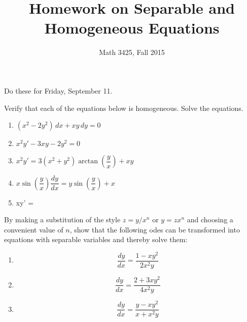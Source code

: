 \documentclass[11pt]{amsart}
\begin{document}
\title{Homework on Separable and Homogeneous Equations}
\author{Math 3425, Fall 2015}
\maketitle

Do these for Friday, September 11.

\begin{task}
Verify that each of the equations below is homogeneous. Solve the equations.
\begin{enumerate}
\item $(x^2-2y^2)\, dx + xy \, dy = 0$
\item $x^2y' - 3xy - 2y^2 = 0$
\item $x^2y' = 3(x^2+y^2)\arctan\left(\dfrac{y}{x}\right) + xy $
\item $x\sin\left(\dfrac{y}{x}\right) \dfrac{dy}{dx} = y\sin\left(\dfrac{y}{x}\right) + x$
\item xy' = 
\end{enumerate}
\end{task}

\begin{task}
By making a substitution of the style $z = y/x^n$ or $y = zx^n$ and choosing a
convenient value of $n$, show that the following odes can be transformed into equations
with separable variables and thereby solve them:
\begin{enumerate}
\item $$\dfrac{dy}{dx} = \dfrac{1-xy^2}{2x^2y}$$
\item $$\dfrac{dy}{dx} = \dfrac{2+3xy^2}{4x^2y}$$
\item $$\dfrac{dy}{dx} = \dfrac{y-xy^2}{x+x^2y}$$
\end{enumerate}
\end{task}
\end{document}
